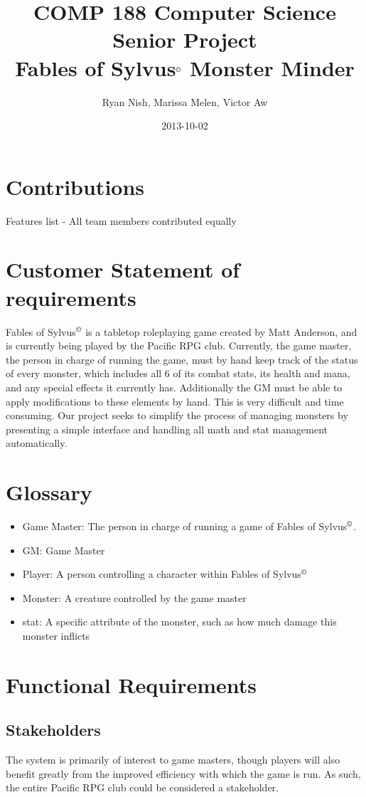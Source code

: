 \documentclass[letterpaper,12pt]{article}
\author{Ryan Nish, Marissa Melen, Victor Aw}
\title{COMP 188 Computer Science Senior Project\\ Fables of
  Sylvus$^{\small \copyright}$ Monster Minder}
\date{2013-10-02}
\begin{document}
\maketitle
\pagebreak
\section{Contributions}
Features list - All team members contributed equally
\pagebreak
\tableofcontents
\pagebreak
\section{Customer Statement of requirements}
Fables of Sylvus$^{\tiny \copyright}$ is a tabletop roleplaying game created by Matt
Anderson, and is currently being played by the Pacific RPG
club. Currently, the game master, the person in charge of running the
game, must by hand keep track of the status of every monster, which
includes all 6 of its combat stats, its health and mana, and any
special effects it currently has. Additionally the GM must be able to
apply modifications to these elements by hand. This is very difficult
and time consuming. Our project seeks to simplify the process of
managing monsters by presenting a simple interface and handling all
math and stat management automatically.
\pagebreak
\section{Glossary}
\begin{itemize}
\item Game Master: The person in charge of running a game of Fables of
  Sylvus$^{\tiny \copyright}$.
\item GM: Game Master
\item Player: A person controlling a character within Fables of Sylvus$^{\tiny \copyright}$
\item Monster: A creature controlled by the game master
\item stat: A specific attribute of the monster, such as how much
  damage this monster inflicts
\end{itemize}
\pagebreak
\section{Functional Requirements}
\subsection{Stakeholders}
The system is primarily of interest to game masters, though players
will also benefit greatly from the improved efficiency with which the
game is run. As such, the entire Pacific RPG club could be considered
a stakeholder.
\end{document}
